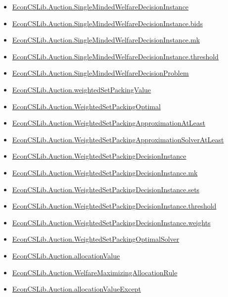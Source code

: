 \documentclass[10pt]{article}
\begin{document}
\begin{itemize}[leftmargin=1.2em]
\begin{itemize}[leftmargin=1.2em]
\item \hyperlink{library-prerequisite-e803b1287eb2b9ca}{EconCSLib.Auction.SingleMindedWelfareDecisionInstance}
\item \hyperlink{library-prerequisite-0d9d0edc792c3aaa}{EconCSLib.Auction.SingleMindedWelfareDecisionInstance.bids}
\item \hyperlink{library-prerequisite-a2b8130dad05eedc}{EconCSLib.Auction.SingleMindedWelfareDecisionInstance.mk}
\item \hyperlink{library-prerequisite-e3e0c94b88875368}{EconCSLib.Auction.SingleMindedWelfareDecisionInstance.threshold}
\item \hyperlink{library-prerequisite-e038b35411760037}{EconCSLib.Auction.SingleMindedWelfareDecisionProblem}
\item \hyperlink{library-prerequisite-92d2b4b4263651db}{EconCSLib.Auction.weightedSetPackingValue}
\item \hyperlink{library-prerequisite-93d2c0023d040eac}{EconCSLib.Auction.WeightedSetPackingOptimal}
\item \hyperlink{library-prerequisite-916985d5dcb3dd91}{EconCSLib.Auction.WeightedSetPackingApproximationAtLeast}
\item \hyperlink{library-prerequisite-c467f60b8545561c}{EconCSLib.Auction.WeightedSetPackingApproximationSolverAtLeast}
\item \hyperlink{library-prerequisite-b2bc39427648d0db}{EconCSLib.Auction.WeightedSetPackingDecisionInstance}
\item \hyperlink{library-prerequisite-ceb19ff5d9fb0e1a}{EconCSLib.Auction.WeightedSetPackingDecisionInstance.mk}
\item \hyperlink{library-prerequisite-2e1398046019ca56}{EconCSLib.Auction.WeightedSetPackingDecisionInstance.sets}
\item \hyperlink{library-prerequisite-4c2f52fb3b310721}{EconCSLib.Auction.WeightedSetPackingDecisionInstance.threshold}
\item \hyperlink{library-prerequisite-9a546197dec5c588}{EconCSLib.Auction.WeightedSetPackingDecisionInstance.weights}
\item \hyperlink{library-prerequisite-a68e274a8ce07b8a}{EconCSLib.Auction.WeightedSetPackingOptimalSolver}
\item \hyperlink{library-prerequisite-2d934ed13944f06c}{EconCSLib.Auction.allocationValue}
\item \hyperlink{library-prerequisite-b6a137565519c9cf}{EconCSLib.Auction.WelfareMaximizingAllocationRule}
\item \hyperlink{library-prerequisite-27fd09b18cf4d2e7}{EconCSLib.Auction.allocationValueExcept}

\end{itemize}
\end{itemize}
\end{document}
